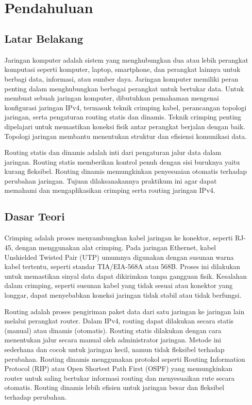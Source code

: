 \section{Pendahuluan}
\subsection{Latar Belakang}
\paragraph{} 
Jaringan komputer adalah sistem yang menghubungkan dua atau lebih perangkat komputasi seperti komputer, laptop, smartphone, dan perangkat lainnya untuk berbagi data, informasi, atau sumber daya. Jaringan komputer memiliki peran penting dalam menghubungkan berbagai perangkat untuk bertukar data. Untuk membuat sebuah jaringan komputer, dibutuhkan pemahaman mengenai konfigurasi jaringan IPv4, termasuk teknik crimping kabel, perancangan topologi jaringan, serta pengaturan routing statis dan dinamis. Teknik crimping penting dipelajari untuk memastikan koneksi fisik antar perangkat berjalan dengan baik. Topologi jaringan membantu menentukan struktur dan efisiensi komunikasi data.

Routing statis dan dinamis adalah inti dari pengaturan jalur data dalam jaringan. Routing statis memberikan kontrol penuh dengan sisi buruknya yaitu kurang fleksibel. Routing dinamis memungkinkan penyesuaian otomatis terhadap perubahan jaringan. Tujuan dilaksanakannya praktikum ini agar dapat memahami dan mengaplikasikan crimping serta routing jaringan IPv4.

\subsection{Dasar Teori}
\paragraph{}
Crimping adalah proses menyambungkan kabel jaringan ke konektor, seperti RJ-45, dengan menggunakan alat crimping. Pada jaringan Ethernet, kabel Unshielded Twisted Pair (UTP) umumnya digunakan dengan susunan warna kabel tertentu, seperti standar TIA/EIA-568A atau 568B. Proses ini dilakukan untuk memastikan sinyal data dapat dikirimkan tanpa gangguan fisik. Kesalahan dalam crimping, seperti susunan kabel yang tidak sesuai atau konektor yang longgar, dapat menyebabkan koneksi jaringan tidak stabil atau tidak berfungsi.

Routing adalah proses pengiriman paket data dari satu jaringan ke jaringan lain melalui perangkat router. Dalam IPv4, routing dapat dilakukan secara statis (manual) atau dinamis (otomatis). Routing statis dilakukan dengan cara menentukan jalur secara manual oleh administrator jaringan. Metode ini sederhana dan cocok untuk jaringan kecil, namun tidak fleksibel terhadap perubahan. Routing dinamis menggunakan protokol seperti Routing Information Protocol (RIP) atau Open Shortest Path First (OSPF) yang memungkinkan router untuk saling bertukar informasi routing dan menyesuaikan rute secara otomatis. Routing dinamis lebih efisien untuk jaringan besar dan fleksibel terhadap perubahan.

